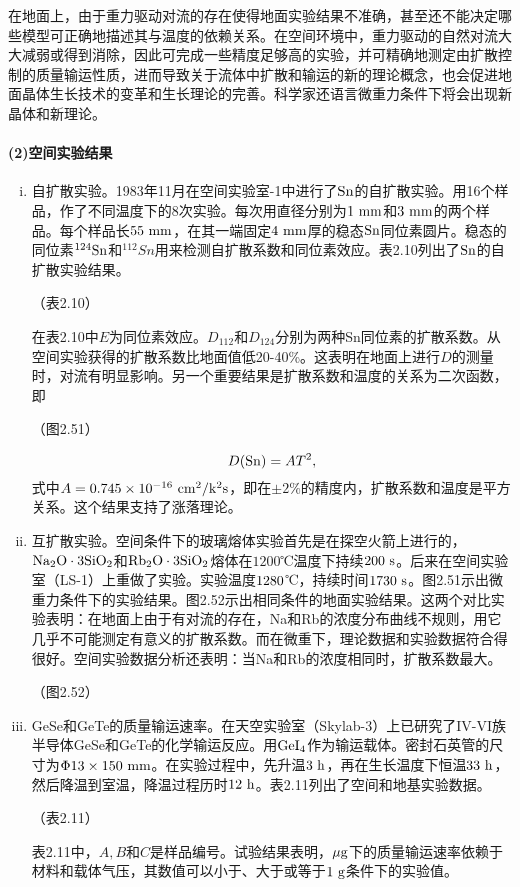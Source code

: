 在地面上，由于重力驱动对流的存在使得地面实验结果不准确，甚至还不能决定哪些模型可正确地描述其与温度的依赖关系。在空间环境中，重力驱动的自然对流大大减弱或得到消除，因此可完成一些精度足够高的实验，并可精确地测定由扩散控制的质量输运性质，进而导致关于流体中扩散和输运的新的理论概念，也会促进地面晶体生长技术的变革和生长理论的完善。科学家还语言微重力条件下将会出现新晶体和新理论。

\paragraph{(2)空间实验结果}
\begin{enumerate}[(i)]\itemsep -0.5ex
\item 自扩散实验。1983年11月在空间实验室-1中进行了$\rm Sn$的自扩散实验。用16个样品，作了不同温度下的8次实验。每次用直径分别为$\rm 1\ mm$和$\rm 3\ mm$的两个样品。每个样品长$\rm 55\ mm$，在其一端固定$\rm 4\ mm$厚的稳态$\rm Sn$同位素圆片。稳态的同位素$\rm^{124}Sn$和$^{112}Sn$用来检测自扩散系数和同位素效应。表2.10列出了$\rm Sn$的自扩散实验结果。

（表2.10）

在表2.10中$E$为同位素效应。$D_{112}$和$D_{124}$分别为两种Sn同位素的扩散系数。从空间实验获得的扩散系数比地面值低20-40\%。这表明在地面上进行$D$的测量时，对流有明显影响。另一个重要结果是扩散系数和温度的关系为二次函数，即

（图2.51）

\begin{equation}
D({\rm Sn})=AT^2,
\end{equation}
式中$A=0.745\times 10^{-16}\ \rm cm^2/k^2s$，即在$\pm2\%$的精度内，扩散系数和温度是平方关系。这个结果支持了涨落理论。

\item 互扩散实验。空间条件下的玻璃熔体实验首先是在探空火箭上进行的，$\rm Na_2O\cdot3SiO_2$和$\rm Rb_2O\cdot3SiO_2$熔体在$1200$℃温度下持续$\rm 200\ s$。后来在空间实验室（LS-1）上重做了实验。实验温度$\rm 1280$℃，持续时间$\rm 1730\ s$。图2.51示出微重力条件下的实验结果。图2.52示出相同条件的地面实验结果。这两个对比实验表明：在地面上由于有对流的存在，Na和Rb的浓度分布曲线不规则，用它几乎不可能测定有意义的扩散系数。而在微重下，理论数据和实验数据符合得很好。空间实验数据分析还表明：当Na和Rb的浓度相同时，扩散系数最大。

（图2.52）

\item GeSe和GeTe的质量输运速率。在天空实验室（Skylab-3）上已研究了IV-VI族半导体GeSe和GeTe的化学输运反应。用$\rm GeI_4$作为输运载体。密封石英管的尺寸为$\Phi\rm13\times150\ mm$。在实验过程中，先升温$\rm3\ h$，再在生长温度下恒温$\rm33\ h$，然后降温到室温，降温过程历时$\rm12\ h$。表2.11列出了空间和地基实验数据。

（表2.11）

\noindent 表2.11中，$A,B$和$C$是样品编号。试验结果表明，$\rm\mu g$下的质量输运速率依赖于材料和载体气压，其数值可以小于、大于或等于$1\rm\ g$条件下的实验值。
\end{enumerate}